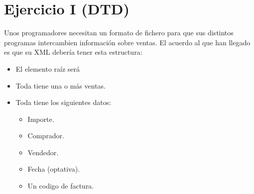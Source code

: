 \documentclass[letterpaper,10pt,spanish]{sphinxmanual}
\begin{document}
\section{Ejercicio I (DTD)}
\label{\detokenize{tema5:ejercicio-i-dtd}}
Unos programadores necesitan un formato de fichero para que sus distintos programas intercambien información sobre ventas. El acuerdo al que han llegado es que su XML debería tener esta estructura:
\begin{itemize}
\item {} 
El elemento raíz será 

\item {} 
Toda  tiene una o más ventas.

\item {} 
Toda  tiene los siguientes datos:
\begin{itemize}
\item {} 
Importe.

\item {} 
Comprador.

\item {} 
Vendedor.

\item {} 
Fecha (optativa).

\item {} 
Un codigo de factura.

\end{itemize}

\end{itemize}
\end{document}
